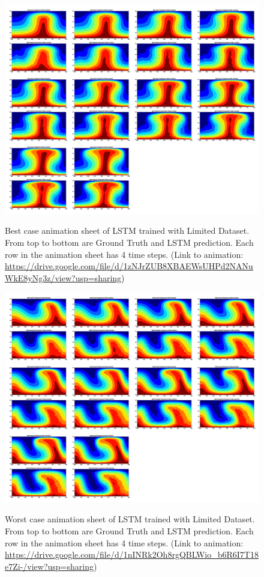 \begin{figure}[H]
    \centering
    \caption{Best case animation sheet of LSTM trained with Limited Dataset. From top to bottom are Ground Truth and LSTM prediction. Each row in the animation sheet has 4 time steps. (Link to animation: \url{https://drive.google.com/file/d/1zNJrZUB8XBAEWsUHPd2NANuWkE8yNg3z/view?usp=sharing})}
    \includegraphics[scale=0.15]{figures/mantle_convection_images/limited_dataset/LSTM_Best_GIF_sheet.png}
    \label{figure:LSTM_limited_best_gif}
\end{figure}



\begin{figure}[H]
    \centering
    \caption{Worst case animation sheet of LSTM trained with Limited Dataset. From top to bottom are Ground Truth and LSTM prediction. Each row in the animation sheet has 4 time steps. (Link to animation: \url{https://drive.google.com/file/d/1nINRk2Oh8rgQBLWio_b6R6I7T18e7Zi-/view?usp=sharing})}
    \includegraphics[scale=0.15]{figures/mantle_convection_images/limited_dataset/LSTM_Worst_GIF_sheet.png}
    \label{figure:LSTM_limited_worst_gif}
\end{figure}

